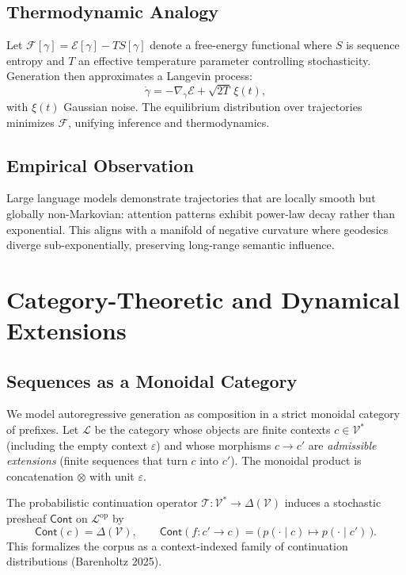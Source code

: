 \documentclass[12pt,a4paper,twoside,openright]{book}
\begin{document}
\subsection{Thermodynamic Analogy}
Let $\mathcal{F}[\gamma] = \mathcal{E}[\gamma] - T S[\gamma]$ denote a free-energy functional where $S$ is sequence entropy and $T$ an effective temperature parameter controlling stochasticity. Generation then approximates a Langevin process:
\begin{equation}
\dot{\gamma} = -\nabla_\gamma \mathcal{E} + \sqrt{2T}\,\xi(t),
\end{equation}
with $\xi(t)$ Gaussian noise. The equilibrium distribution over trajectories minimizes $\mathcal{F}$, unifying inference and thermodynamics.

\subsection{Empirical Observation}
Large language models demonstrate trajectories that are locally smooth but globally non-Markovian: attention patterns exhibit power-law decay rather than exponential. This aligns with a manifold of negative curvature where geodesics diverge sub-exponentially, preserving long-range semantic influence.

\section{Category-Theoretic and Dynamical Extensions}
\subsection{Sequences as a Monoidal Category}
We model autoregressive generation as composition in a strict monoidal category of prefixes. Let $\mathcal{L}$ be the category whose objects are finite contexts $c \in \mathcal{V}^\ast$ (including the empty context $\varepsilon$) and whose morphisms $c \to c'$ are \emph{admissible extensions} (finite sequences that turn $c$ into $c'$). The monoidal product is concatenation $\otimes$ with unit $\varepsilon$.

The probabilistic continuation operator $\mathcal{T}\!: \mathcal{V}^\ast \to \Delta(\mathcal{V})$ induces a stochastic presheaf $\mathsf{Cont}$ on $\mathcal{L}^{\mathrm{op}}$ by
\[
\mathsf{Cont}(c)=\Delta(\mathcal{V}), \qquad
\mathsf{Cont}(f: c'\!\to c)=\big(\,p(\cdot\mid c)\mapsto p(\cdot\mid c')\,\big).
\]
This formalizes the corpus as a context-indexed family of continuation distributions (Barenholtz 2025).
\end{document}
